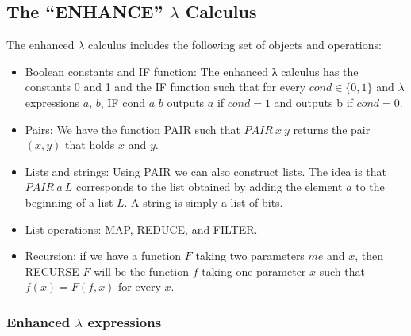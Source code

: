 \documentclass[aps,pra,onecolumn,notitlepage,superscriptaddress]{revtex4-1}
\begin{document}
    \subsection{The ``ENHANCE'' $\lambda$ Calculus}
    The enhanced $\lambda$ calculus includes the following set of objects and operations:
    \begin{itemize}
        \item Boolean constants and IF function: The enhanced λ calculus has the constants 0 and 1 and the IF function such that for every $cond \in \{0, 1\}$ and $\lambda$ expressions $a$, $b$, IF cond $a$ $b$ outputs $a$ if $cond = 1$ and outputs b if $cond = 0$.
        \item Pairs: We have the function PAIR such that $PAIR \ x \ y$ returns the pair $(x, y)$ that holds $x$ and $y$.
        \item Lists and strings: Using PAIR we can also construct lists. The idea is that $PAIR\ a\ L$ corresponds to the list obtained by adding the element $a$ to the beginning of a list $L$. A string is simply a list of bits.
        \item List operations: MAP, REDUCE, and FILTER.
        \item Recursion: if we have a function $F$ taking two parameters $me$ and $x$, then RECURSE $F$ will be the function $f$ taking one parameter $x$ such that $f(x) = F (f, x)$ for every $x$.
    \end{itemize}

    \subsubsection{Enhanced $\lambda$ expressions}
    








    
\end{document}
